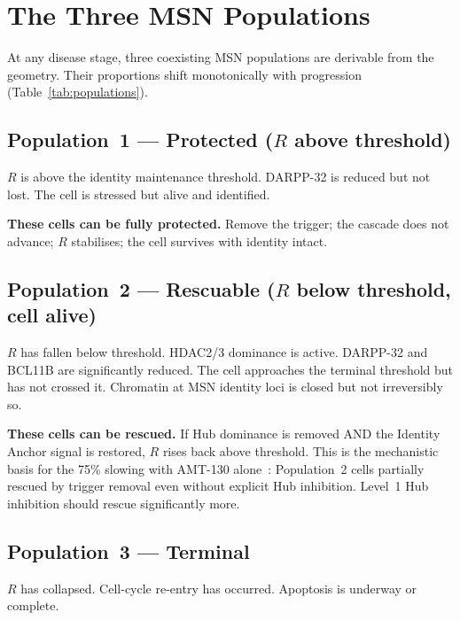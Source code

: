 \documentclass[12pt,a4paper]{article}
\newcommand{\Rratio}{R}
\begin{document}
\section{The Three MSN Populations}

At any disease stage, three coexisting MSN populations are
derivable from the geometry. Their proportions shift
monotonically with progression (Table~\ref{tab:populations}).

\subsection{Population~1 --- Protected
(\texorpdfstring{$\Rratio$}{R} above threshold)}

$\Rratio$ is above the identity maintenance threshold.
DARPP-32 is reduced but not lost. The cell is stressed but
alive and identified.

\textbf{These cells can be fully protected.} Remove the
trigger; the cascade does not advance; $\Rratio$ stabilises;
the cell survives with identity intact.

\subsection{Population~2 --- Rescuable
(\texorpdfstring{$\Rratio$}{R} below threshold, cell alive)}

$\Rratio$ has fallen below threshold. HDAC2/3 dominance is
active. DARPP-32 and BCL11B are significantly reduced.
The cell approaches the terminal threshold but has not
crossed it. Chromatin at MSN identity loci is closed but
not irreversibly so.

\textbf{These cells can be rescued.} If Hub dominance is
removed AND the Identity Anchor signal is restored,
$\Rratio$ rises back above threshold. This is the
mechanistic basis for the 75\% slowing with AMT-130
alone~\cite{AMT130_2025}: Population~2 cells partially
rescued by trigger removal even without explicit Hub
inhibition. Level~1 Hub inhibition should rescue
significantly more.

\subsection{Population~3 --- Terminal}

$\Rratio$ has collapsed. Cell-cycle re-entry has occurred.
Apoptosis is underway or complete.
\end{document}
